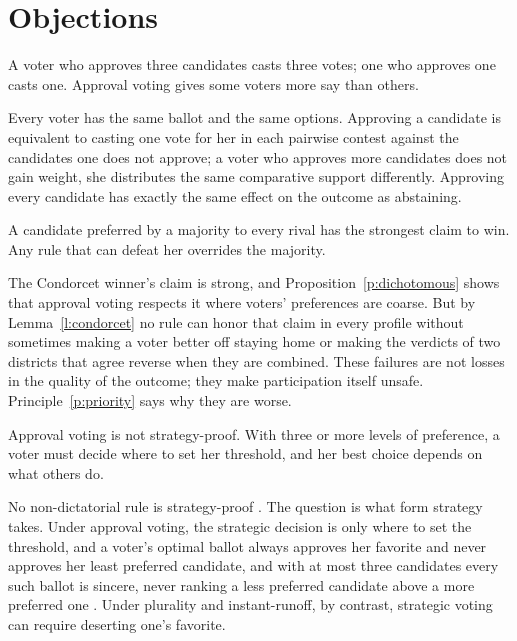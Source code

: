 \documentclass{situationist-preprint}
\begin{document}
\section{Objections}

\begin{objection}
A voter who approves three candidates casts three votes; one who approves one casts one. Approval voting gives some voters more say than others.
\end{objection}

\begin{reply}
Every voter has the same ballot and the same options. Approving a candidate is equivalent to casting one vote for her in each pairwise contest against the candidates one does not approve; a voter who approves more candidates does not gain weight, she distributes the same comparative support differently. Approving every candidate has exactly the same effect on the outcome as abstaining.
\end{reply}

\begin{objection}
A candidate preferred by a majority to every rival has the strongest claim to win. Any rule that can defeat her overrides the majority.
\end{objection}

\begin{reply}
The Condorcet winner's claim is strong, and Proposition~\ref{p:dichotomous} shows that approval voting respects it where voters' preferences are coarse. But by Lemma~\ref{l:condorcet} no rule can honor that claim in every profile without sometimes making a voter better off staying home or making the verdicts of two districts that agree reverse when they are combined. These failures are not losses in the quality of the outcome; they make participation itself unsafe. Principle~\ref{p:priority} says why they are worse.
\end{reply}

\begin{objection}
Approval voting is not strategy-proof. With three or more levels of preference, a voter must decide where to set her threshold, and her best choice depends on what others do.
\end{objection}

\begin{reply}
No non-dictatorial rule is strategy-proof \citep{Gibbard1973,Satterthwaite1975}. The question is what form strategy takes. Under approval voting, the strategic decision is only where to set the threshold, and a voter's optimal ballot always approves her favorite and never approves her least preferred candidate, and with at most three candidates every such ballot is sincere, never ranking a less preferred candidate above a more preferred one \citep{BramsFishburn1983}. Under plurality and instant-runoff, by contrast, strategic voting can require deserting one's favorite.
\end{reply}
\end{document}
